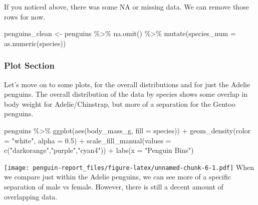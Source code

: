 \documentclass[
]{article}
\newenvironment{Shaded}{\begin{snugshade}}{\end{snugshade}}
\newcommand{\AttributeTok}[1]{\textcolor[rgb]{0.77,0.63,0.00}{#1}}
\newcommand{\FloatTok}[1]{\textcolor[rgb]{0.00,0.00,0.81}{#1}}
\newcommand{\FunctionTok}[1]{\textcolor[rgb]{0.00,0.00,0.00}{#1}}
\newcommand{\NormalTok}[1]{#1}
\newcommand{\OtherTok}[1]{\textcolor[rgb]{0.56,0.35,0.01}{#1}}
\newcommand{\SpecialCharTok}[1]{\textcolor[rgb]{0.00,0.00,0.00}{#1}}
\newcommand{\StringTok}[1]{\textcolor[rgb]{0.31,0.60,0.02}{#1}}
\begin{document}
If you noticed above, there was some NA or missing data. We can remove
those rows for now.

\begin{Shaded}
\begin{Highlighting}[]
\NormalTok{penguins\_clean }\OtherTok{\textless{}{-}}\NormalTok{ penguins }\SpecialCharTok{\%\textgreater{}\%} 
  \FunctionTok{na.omit}\NormalTok{() }\SpecialCharTok{\%\textgreater{}\%} 
  \FunctionTok{mutate}\NormalTok{(}\AttributeTok{species\_num =} \FunctionTok{as.numeric}\NormalTok{(species))}
\end{Highlighting}
\end{Shaded}

\hypertarget{plot-section}{%
\subsubsection{Plot Section}\label{plot-section}}

Let's move on to some plots, for the overall distributions and for just
the Adelie penguins. The overall distribution of the data by species
shows some overlap in body weight for Adelie/Chinstrap, but more of a
separation for the Gentoo penguins.

\begin{Shaded}
\begin{Highlighting}[]
\NormalTok{penguins }\SpecialCharTok{\%\textgreater{}\%} 
  \FunctionTok{ggplot}\NormalTok{(}\FunctionTok{aes}\NormalTok{(body\_mass\_g, }\AttributeTok{fill =}\NormalTok{ species)) }\SpecialCharTok{+} 
  \FunctionTok{geom\_density}\NormalTok{(}\AttributeTok{color =} \StringTok{"white"}\NormalTok{, }\AttributeTok{alpha =} \FloatTok{0.5}\NormalTok{) }\SpecialCharTok{+}
  \FunctionTok{scale\_fill\_manual}\NormalTok{(}\AttributeTok{values =} \FunctionTok{c}\NormalTok{(}\StringTok{"darkorange"}\NormalTok{,}\StringTok{"purple"}\NormalTok{,}\StringTok{"cyan4"}\NormalTok{)) }\SpecialCharTok{+}
  \FunctionTok{labs}\NormalTok{(}\AttributeTok{x =} \StringTok{"Penguin Bins"}\NormalTok{)}
\end{Highlighting}
\end{Shaded}

\texttt{[image: penguin-report\_files/figure-latex/unnamed-chunk-6-1.pdf]}
When we compare just within the Adelie penguins, we can see more of a
specific separation of male vs female. However, there is still a decent
amount of overlapping data.
\end{document}
